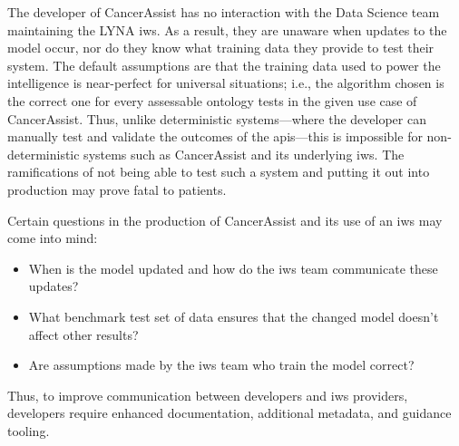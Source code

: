 The developer of CancerAssist has no interaction with the Data Science team maintaining the LYNA \gls{iws}. As a result, they are unaware when updates to the model occur, nor do they know what training data they provide to test their system. The default assumptions are that the training data used to power the intelligence is near-perfect for universal situations; i.e., the algorithm chosen is the correct one for every assessable ontology tests in the given use case of CancerAssist. Thus, unlike deterministic systems---where the developer can manually test and validate the outcomes of the \glspl{api}---this is impossible for non-deterministic systems such as CancerAssist and its underlying \gls{iws}. The ramifications of not being able to test such a system and putting it out into production may prove fatal to patients.

Certain questions in the production of CancerAssist and its use of an \gls{iws} may come into mind:

\begin{itemize}%
  \item When is the model updated and how do the \gls{iws} team communicate these updates?
  \item What benchmark test set of data ensures that the changed model doesn't affect other results?
  \item Are assumptions made by the \gls{iws} team who train the model correct?
\end{itemize}

Thus, to improve communication between developers and \gls{iws} providers, developers require enhanced documentation, additional metadata, and guidance tooling.

